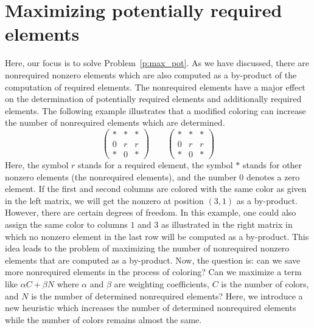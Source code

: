 \documentclass[12pt, twoside,a4paper,toc=bibliography]{scrbook}
\begin{document}
\section{Maximizing potentially required elements}
\label{s.max.pot.req}
Here, our focus is to solve Problem~\ref{p:max_pot}.
As we have discussed, there are nonrequired nonzero elements
which are also computed as a by-product of the computation of required elements.
The nonrequired elements have a major effect on
the determination of potentially required elements
and additionally required elements.
The following example illustrates that
a modified coloring can increase the number of nonrequired elements
which are determined.
\begin{equation}
\left(\begin{array}{rrb}
* & * & *\\
0 & r & r \\
* & 0 & *
\end{array}\right)
\qquad
\left(\begin{array}{rbr}
* & * & *\\
0 & r & r \\
* & 0 & *
\end{array}\right)
\label{twocolorings}
\end{equation}
Here, the symbol $r$ stands for a required element,
the symbol \textit{$*$} stands for other nonzero elements (the nonrequired elements),
and the number $0$ denotes a zero element.
If the first and second columns are colored with the same color as given in the left matrix,
we will get the nonzero at position $(3,1)$ as a by-product.
However, there are certain degrees of freedom. In
this example, one could also assign the same color to columns $1$ and
$3$ as illustrated in the right matrix
in which no nonzero element in the last row will be computed
as a by-product. This idea leads to the problem of maximizing
the number of nonrequired nonzero elements that are computed as a by-product.
Now, the question is: can we save
more nonrequired elements in the process of coloring?
Can we maximize a term like $\alpha C + \beta N$ where $\alpha$ and $\beta$ are
weighting coefficients, $C$ is the number of colors, and $N$ is the
number of determined nonrequired elements?
Here, we introduce a new heuristic 
which increases the number of determined nonrequired elements 
while the number of colors remains almost the same.
\end{document}
